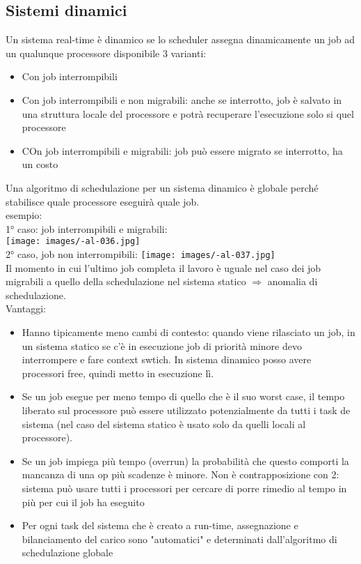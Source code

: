 \documentclass{article}
\begin{document}
\subsection{Sistemi dinamici}
Un sistema real-time è dinamico se lo scheduler assegna dinamicamente un job ad un qualunque processore disponibile
3 varianti:
\begin{itemize}
\item Con job interrompibili
\item Con job interrompibili e non migrabili: anche se interrotto, job è salvato in una struttura locale del processore e potrà recuperare l'esecuzione solo si quel processore
\item COn job interrompibili e migrabili: job può essere migrato se interrotto, ha un costo
\end{itemize}
Una algoritmo di schedulazione per un sistema dinamico è globale perché stabilisce quale processore eseguirà quale job. \\esempio:\\
1° caso: job interrompibili e migrabili:\\
\texttt{[image: images/-al-036.jpg]}\\
2° caso, job non interrompibili:
\texttt{[image: images/-al-037.jpg]}\\ Il momento in cui l'ultimo job completa il lavoro è uguale nel caso dei job migrabili a quello della schedulazione nel sistema statico $\Rightarrow$ anomalia di schedulazione.\\ Vantaggi:
\begin{itemize}
\item Hanno tipicamente meno cambi di contesto: quando viene rilasciato un job, in un sistema statico se c'è in esecuzione job di priorità minore devo interrompere e fare context swtich. In sistema dinamico posso avere processori free, quindi metto in esecuzione lì.
\item Se un job esegue per meno tempo di quello che è il suo worst case, il tempo liberato sul processore può essere utilizzato potenzialmente da tutti i task de sistema (nel caso del sistema statico è usato solo da quelli locali al processore).
\item Se un job impiega più tempo (overrun) la probabilità che questo comporti la mancanza di una op più scadenze è minore. Non è contrapposizione con 2: sistema può usare tutti i processori per cercare di porre rimedio al tempo in più per cui il job ha eseguito
\item Per ogni task del sistema che è creato a run-time, assegnazione e bilanciamento del carico sono "automatici" e determinati dall'algoritmo di schedulazione globale
\end{itemize}
\end{document}
